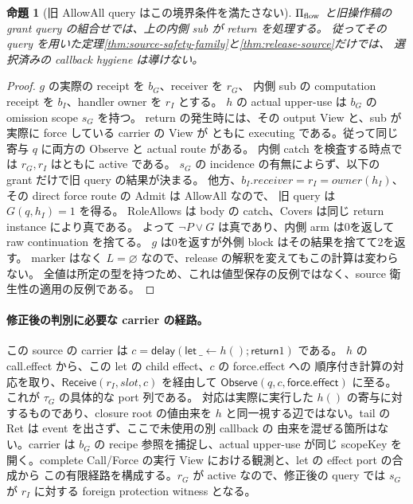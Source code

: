 \documentclass[11pt,a4paper]{article}
\newtheorem{proposition}[definition]{命題}
\newcommand{\Ret}{\mathsf{return}}
\newcommand{\Delay}{\mathsf{delay}}
\begin{document}
\begin{proposition}[旧 AllowAll query はこの境界条件を満たさない]
\label{prop:wildcard-bypass}
\(\Pi_{\rm flow}\) と旧操作稿の grant query の組合せでは、上の内側 sub が return を処理する。
従ってその query を用いた定理\ref{thm:source-safety-family}と\ref{thm:release-source}だけでは、
選択済みの callback hygiene は導けない。
\end{proposition}
\begin{proof}
\(g\) の実際の receipt を \(b_G\)、receiver を \(r_G\)、
内側 sub の computation receipt を \(b_I\)、handler owner を \(r_I\) とする。
\(h\) の actual upper-use は \(b_G\) の omission scope \(s_G\) を持つ。
return の発生時には、その output View と、sub が実際に force している carrier の View が
ともに executing である。従って同じ寄与 \(q\) に両方の Observe と actual route がある。
内側 catch を検査する時点では \(r_G,r_I\) はともに active である。
\(s_G\) の incidence の有無によらず、以下の grant だけで旧 query の結果が決まる。
他方、\(b_I.receiver=r_I=owner(h_I)\)、その direct force route の Admit は AllowAll なので、
旧 query は \(G(q,h_I)=1\) を得る。
RoleAllows は body の catch、Covers は同じ return instance により真である。
よって \(\neg P\lor G\) は真であり、内側 arm は0を返して raw continuation を捨てる。
\(g\) は0を返すが外側 block はその結果を捨てて2を返す。
marker はなく \(L=\varnothing\) なので、release の解釈を変えてもこの計算は変わらない。
全値は所定の型を持つため、これは値型保存の反例ではなく、source 衛生性の適用の反例である。
\end{proof}

\paragraph{修正後の判別に必要な carrier の経路。}
この source の carrier は \(c=\Delay(\mathsf{let}\ \_\leftarrow h();\Ret1)\) である。
\(h\) の call.effect から、この let の child effect、\(c\) の force.effect への
順序付き計算の対応を取り、\(\mathsf{Receive}(r_I,slot,c)\) を経由して
\(\mathsf{Observe}(q,c,\mathsf{force.effect})\) に至る。
これが \(\tau_G\) の具体的な port 列である。
対応は実際に実行した \(h()\) の寄与に対するものであり、closure root の値由来を
\(h\) と同一視する辺ではない。tail の Ret は event を出さず、ここで未使用の別 callback の
由来を混ぜる箇所はない。carrier は \(b_G\) の recipe 参照を捕捉し、actual upper-use が同じ
scopeKey を開く。complete Call/Force の実行 View における観測と、let の effect port の合成から
この有限経路を構成する。\(r_G\) が active なので、修正後の query では
\(s_G\) が \(r_I\) に対する foreign protection witness となる。
\end{document}
